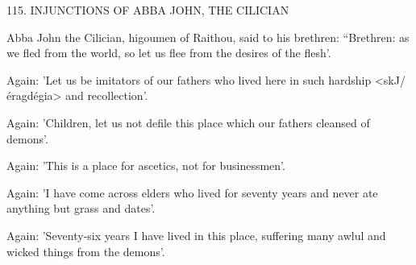 115. INJUNCTIONS OF ABBA JOHN, THE CILICIAN

Abba John the Cilician, higoumen of Raithou, said to his brethren:
“Brethren: as we fled from the world, so let us flee from the desires
of the flesh'.

Again: 'Let us be imitators of our fathers who lived here in such
hardship <skJ/éragdégia> and recollection'.

Again: 'Children, let us not defile this place which our fathers
cleansed of demons'.

Again: 'This is a place for ascetics, not for businessmen'.

Again: 'I have come across elders who lived for seventy years
and never ate anything but grass and dates'.

Again: 'Seventy-six years I have lived in this place, suffering
many awlul and wicked things from the demons'.

